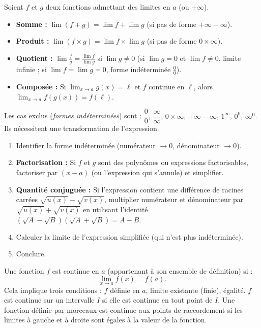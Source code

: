 \documentclass[11pt]{article}
\newcommand{\cle}[1]{{\popxbold\color{popdark}#1}}
\begin{document}
\begin{propriete}
Soient $f$ et $g$ deux fonctions admettant des limites en $a$ (ou $+\infty$).
\begin{itemize}
\item \textbf{Somme :} $\lim (f+g) = \lim f + \lim g$ (si pas de forme $+\infty - \infty$).
\item \textbf{Produit :} $\lim (f \times g) = \lim f \times \lim g$ (si pas de forme $0 \times \infty$).
\item \textbf{Quotient :} $\lim \frac{f}{g} = \frac{\lim f}{\lim g}$ si $\lim g \neq 0$ (si $\lim g = 0$ et $\lim f \neq 0$, limite infinie ; si $\lim f = \lim g = 0$, forme indéterminée $\frac{0}{0}$).
\item \textbf{Composée :} Si $\lim_{x \to a} g(x) = \ell$ et $f$ continue en $\ell$, alors $\lim_{x \to a} f(g(x)) = f(\ell)$.
\end{itemize}
Les cas exclus (\emph{formes indéterminées}) sont : $\dfrac{0}{0}$, $\dfrac{\infty}{\infty}$, $0 \times \infty$, $+\infty - \infty$, $1^\infty$, $0^0$, $\infty^0$. Ils nécessitent une transformation de l'expression.
\end{propriete}

\begin{methode}
\begin{enumerate}
\item Identifier la forme indéterminée (numérateur $\to 0$, dénominateur $\to 0$).
\item \textbf{Factorisation :} Si $f$ et $g$ sont des polynômes ou expressions factorisables, factoriser par $(x-a)$ (ou l'expression qui s'annule) et simplifier.
\item \textbf{Quantité conjuguée :} Si l'expression contient une différence de racines carrées $\sqrt{u(x)} - \sqrt{v(x)}$, multiplier numérateur et dénominateur par $\sqrt{u(x)} + \sqrt{v(x)}$ en utilisant l'identité $(\sqrt{A}-\sqrt{B})(\sqrt{A}+\sqrt{B}) = A-B$.
\item Calculer la limite de l'expression simplifiée (qui n'est plus indéterminée).
\item Conclure.
\end{enumerate}
\end{methode}

\begin{definition}
Une fonction $f$ est \cle{continue en $a$} (appartenant à son ensemble de définition) si :
\[ \lim_{x \to a} f(x) = f(a). \]
Cela implique trois conditions : $f$ définie en $a$, limite existante (finie), égalité.
$f$ est \cle{continue sur un intervalle $I$} si elle est continue en tout point de $I$.
Une fonction définie par morceaux est continue aux points de raccordement si les limites à gauche et à droite sont égales à la valeur de la fonction.
\end{definition}
\end{document}
